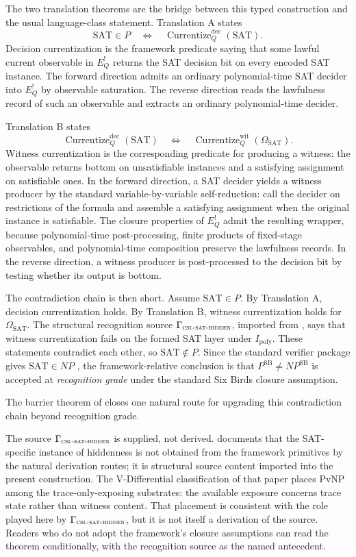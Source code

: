 \documentclass[11pt]{article}
\newcommand{\Ipoly}{I_{\mathrm{poly}}}
\newcommand{\EQbang}{E^{!}_{Q}}
\newcommand{\OmegaSAT}{\Omega_{\mathrm{SAT}}}
\newcommand{\CurrentizeDec}{\operatorname{Currentize}^{\mathrm{dec}}_{Q}}
\newcommand{\CurrentizeWit}{\operatorname{Currentize}^{\mathrm{wit}}_{Q}}
\newcommand{\CSLSATHidden}{\Gamma_{\textsc{csl-sat-hidden}}}
\newcommand{\PSB}{P^{\mathrm{SB}}}
\newcommand{\NPSB}{NP^{\mathrm{SB}}}
\newcommand{\RecognitionGrade}{\emph{recognition grade}}
\newcommand{\VDiff}{V-Differential classification}
\theoremstyle{definition}
\begin{document}
The two translation theorems are the bridge between this typed
construction and the usual language-class statement.  Translation A
states
\[
  \mathrm{SAT}\in P
  \quad\Longleftrightarrow\quad
  \CurrentizeDec(\mathrm{SAT}).
\]
Decision currentization is the framework predicate saying that some
lawful current observable in \(\EQbang\) returns the SAT decision bit
on every encoded SAT instance.  The forward direction admits an
ordinary polynomial-time SAT decider into \(\EQbang\) by observable
saturation.  The reverse direction reads the lawfulness record of such
an observable and extracts an ordinary polynomial-time decider.

Translation B states
\[
  \CurrentizeDec(\mathrm{SAT})
  \quad\Longleftrightarrow\quad
  \CurrentizeWit(\OmegaSAT).
\]
Witness currentization is the corresponding predicate for producing a
witness: the observable returns bottom on unsatisfiable instances and
a satisfying assignment on satisfiable ones.  In the forward
direction, a SAT decider yields a witness producer by the standard
variable-by-variable self-reduction: call the decider on restrictions
of the formula and assemble a satisfying assignment when the original
instance is satisfiable.  The closure properties of \(\EQbang\) admit
the resulting wrapper, because polynomial-time post-processing,
finite products of fixed-stage observables, and polynomial-time
composition preserve the lawfulness records.  In the reverse
direction, a witness producer is post-processed to the decision bit by
testing whether its output is bottom.

The contradiction chain is then short.  Assume \(\mathrm{SAT}\in P\).
By Translation A, decision currentization holds.  By Translation B,
witness currentization holds for \(\OmegaSAT\).  The structural
recognition source \(\CSLSATHidden\), imported from
\citet{TsiokosHiddenness2026}, says that witness currentization fails
on the formed SAT layer under \(\Ipoly\).  These
statements contradict each other, so \(\mathrm{SAT}\notin P\).  Since
the standard verifier package gives \(\mathrm{SAT}\in NP\)
\citep{Cook1971TheoremProving}, the framework-relative conclusion is
that \(\PSB\neq\NPSB\) is accepted at \RecognitionGrade{} under the
standard Six Birds closure assumption.

The barrier theorem of  closes one natural
route for upgrading this contradiction chain beyond recognition grade.

The source \(\CSLSATHidden\) is supplied, not derived.
\citet{TsiokosHiddenness2026} documents that the SAT-specific instance
of hiddenness is not obtained from the framework primitives by the
natural derivation routes; it is structural source content imported
into the present construction.  The \VDiff{} of that paper places PvNP
among the trace-only-exposing substrates: the available exposure
concerns trace state rather than witness content.  That placement is
consistent with the role played here by \(\CSLSATHidden\), but it is
not itself a derivation of the source.
Readers who do not adopt the framework's closure assumptions can read
the theorem conditionally, with the recognition source as the named
antecedent.
\end{document}
